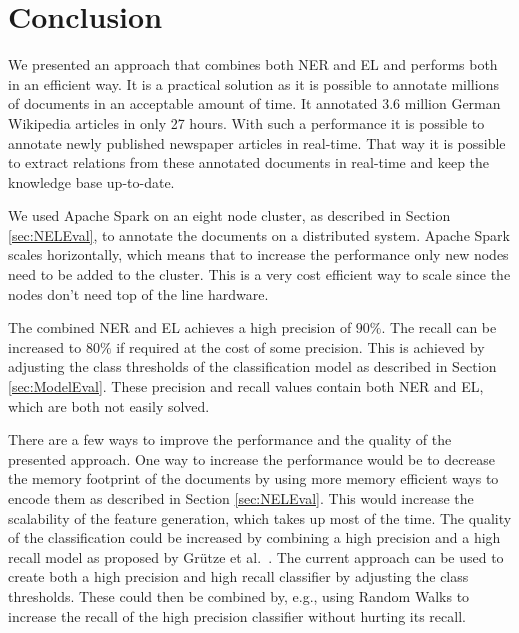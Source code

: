 \section{Conclusion}
\label{sec:Conclusion}
We presented an approach that combines both NER and EL and performs both in an efficient way. It is a practical solution as it is possible to annotate millions of documents in an acceptable amount of time. It annotated 3.6 million German Wikipedia articles in only 27 hours. With such a performance it is possible to annotate newly published newspaper articles in real-time. That way it is possible to extract relations from these annotated documents in real-time and keep the knowledge base up-to-date.\par
We used Apache Spark on an eight node cluster, as described in Section \ref{sec:NELEval}, to annotate the documents on a distributed system. Apache Spark scales horizontally, which means that to increase the performance only new nodes need to be added to the cluster. This is a very cost efficient way to scale since the nodes don't need top of the line hardware.\par
The combined NER and EL achieves a high precision of $90\%$. The recall can be increased to $80\%$ if required at the cost of some precision. This is achieved by adjusting the class thresholds of the classification model as described in Section \ref{sec:ModelEval}. These precision and recall values contain both NER and EL, which are both not easily solved.\par
There are a few ways to improve the performance and the quality of the presented approach. One way to increase the performance would be to decrease the memory footprint of the documents by using more memory efficient ways to encode them as described in Section \ref{sec:NELEval}. This would increase the scalability of the feature generation, which takes up most of the time. The quality of the classification could be increased by combining a high precision and a high recall model as proposed by Grütze et al.\ \cite{coheel}. The current approach can be used to create both a high precision and high recall classifier by adjusting the class thresholds. These could then be combined by, e.g., using Random Walks to increase the recall of the high precision classifier without hurting its recall.
